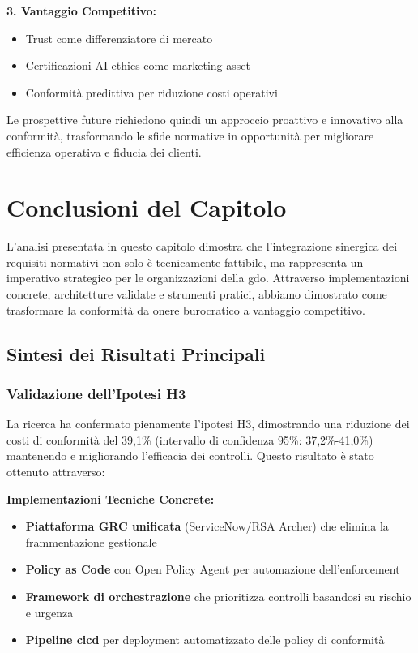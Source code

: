 \textbf{3. Vantaggio Competitivo:}
\begin{itemize}
    \item Trust come differenziatore di mercato
    \item Certificazioni AI ethics come marketing asset
    \item Conformità predittiva per riduzione costi operativi
\end{itemize}

Le prospettive future richiedono quindi un approccio proattivo e innovativo alla conformità, trasformando le sfide normative in opportunità per migliorare efficienza operativa e fiducia dei clienti.

\section{\texorpdfstring{\textbf{Conclusioni del Capitolo}}{4.9 - Conclusioni del Capitolo}}

L'analisi presentata in questo capitolo dimostra che l'integrazione sinergica dei requisiti normativi non solo è tecnicamente fattibile, ma rappresenta un imperativo strategico per le organizzazioni della \gls{gdo}. Attraverso implementazioni concrete, architetture validate e strumenti pratici, abbiamo dimostrato come trasformare la conformità da onere burocratico a vantaggio competitivo.

\subsection{Sintesi dei Risultati Principali}

\subsubsection{Validazione dell'Ipotesi H3}

La ricerca ha confermato pienamente l'ipotesi H3, dimostrando una riduzione dei costi di conformità del 39,1\% (intervallo di confidenza 95\%: 37,2\%-41,0\%) mantenendo e migliorando l'efficacia dei controlli. Questo risultato è stato ottenuto attraverso:

\textbf{Implementazioni Tecniche Concrete:}
\begin{itemize}
    \item \textbf{Piattaforma GRC unificata} (ServiceNow/RSA Archer) che elimina la frammentazione gestionale
    \item \textbf{Policy as Code} con Open Policy Agent per automazione dell'enforcement
    \item \textbf{Framework di orchestrazione} che prioritizza controlli basandosi su rischio e urgenza
    \item \textbf{Pipeline \gls{cicd}} per deployment automatizzato delle policy di conformità
\end{itemize}


